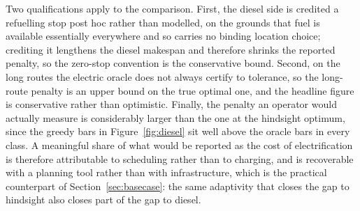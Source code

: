 Two qualifications apply to the comparison. First, the diesel side is credited a refuelling stop post hoc rather than modelled, on the grounds that fuel is available essentially everywhere and so carries no binding location choice; crediting it lengthens the diesel makespan and therefore shrinks the reported penalty, so the zero-stop convention is the conservative bound. Second, on the long routes the electric oracle does not always certify to tolerance, so the long-route penalty is an upper bound on the true optimal one, and the headline figure is conservative rather than optimistic. Finally, the penalty an operator would actually measure is considerably larger than the one at the hindsight optimum, since the greedy bars in Figure~\ref{fig:diesel} sit well above the oracle bars in every class. A meaningful share of what would be reported as the cost of electrification is therefore attributable to scheduling rather than to charging, and is recoverable with a planning tool rather than with infrastructure, which is the practical counterpart of Section~\ref{sec:basecase}: the same adaptivity that closes the gap to hindsight also closes part of the gap to diesel.
